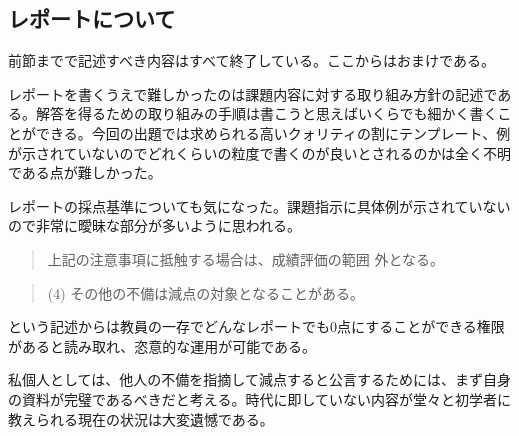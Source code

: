 \documentclass[dvipdfmx,12pt,a4j]{jarticle}
\begin{document}
\subsection{レポートについて}
前節までで記述すべき内容はすべて終了している。ここからはおまけである。

レポートを書くうえで難しかったのは課題内容に対する取り組み方針の記述である。解答を得るための取り組みの手順は書こうと思えばいくらでも細かく書くことができる。今回の出題では求められる高いクォリティの割にテンプレート、例が示されていないのでどれくらいの粒度で書くのが良いとされるのかは全く不明である点が難しかった。

レポートの採点基準についても気になった。課題指示に具体例が示されていないので非常に曖昧な部分が多いように思われる。
\begin{quote}
  上記の注意事項に抵触する場合は、成績評価の範囲
外となる。
\end{quote}

\begin{quote}
  (4) その他の不備は減点の対象となることがある。
\end{quote}
という記述からは教員の一存でどんなレポートでも0点にすることができる権限があると読み取れ、恣意的な運用が可能である。

私個人としては、他人の不備を指摘して減点すると公言するためには、まず自身の資料が完璧であるべきだと考える。時代に即していない内容が堂々と初学者に教えられる現在の状況は大変遺憾である。



\end{document}
